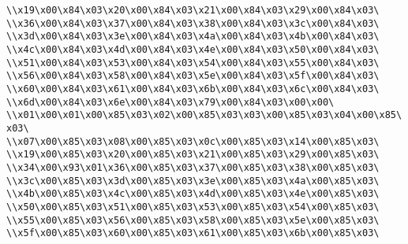 \verb|\\x19\x00\x84\x03\x20\x00\x84\x03\x21\x00\x84\x03\x29\x00\x84\x03\|\newline
\verb|\\x36\x00\x84\x03\x37\x00\x84\x03\x38\x00\x84\x03\x3c\x00\x84\x03\|\newline
\verb|\\x3d\x00\x84\x03\x3e\x00\x84\x03\x4a\x00\x84\x03\x4b\x00\x84\x03\|\newline
\verb|\\x4c\x00\x84\x03\x4d\x00\x84\x03\x4e\x00\x84\x03\x50\x00\x84\x03\|\newline
\verb|\\x51\x00\x84\x03\x53\x00\x84\x03\x54\x00\x84\x03\x55\x00\x84\x03\|\newline
\verb|\\x56\x00\x84\x03\x58\x00\x84\x03\x5e\x00\x84\x03\x5f\x00\x84\x03\|\newline
\verb|\\x60\x00\x84\x03\x61\x00\x84\x03\x6b\x00\x84\x03\x6c\x00\x84\x03\|\newline
\verb|\\x6d\x00\x84\x03\x6e\x00\x84\x03\x79\x00\x84\x03\x00\x00\|\newline
\verb|\\x01\x00\x01\x00\x85\x03\x02\x00\x85\x03\x03\x00\x85\x03\x04\x00\x85\x03\|\newline
\verb|\\x07\x00\x85\x03\x08\x00\x85\x03\x0c\x00\x85\x03\x14\x00\x85\x03\|\newline
\verb|\\x19\x00\x85\x03\x20\x00\x85\x03\x21\x00\x85\x03\x29\x00\x85\x03\|\newline
\verb|\\x34\x00\x93\x01\x36\x00\x85\x03\x37\x00\x85\x03\x38\x00\x85\x03\|\newline
\verb|\\x3c\x00\x85\x03\x3d\x00\x85\x03\x3e\x00\x85\x03\x4a\x00\x85\x03\|\newline
\verb|\\x4b\x00\x85\x03\x4c\x00\x85\x03\x4d\x00\x85\x03\x4e\x00\x85\x03\|\newline
\verb|\\x50\x00\x85\x03\x51\x00\x85\x03\x53\x00\x85\x03\x54\x00\x85\x03\|\newline
\verb|\\x55\x00\x85\x03\x56\x00\x85\x03\x58\x00\x85\x03\x5e\x00\x85\x03\|\newline
\verb|\\x5f\x00\x85\x03\x60\x00\x85\x03\x61\x00\x85\x03\x6b\x00\x85\x03\|\newline
